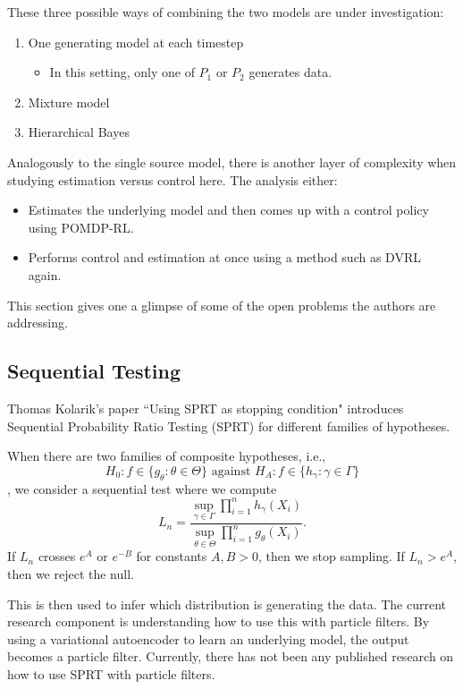 \documentclass[english]{article}
\numberwithin{equation}{section}
\begin{document}
These three possible ways of combining the two models are under investigation:
\begin{enumerate}
	\item One generating model at each timestep
	\begin{itemize}
		\item In this setting, only one of $P_1$ or $P_2$ generates data.
	\end{itemize}
	\item Mixture model
	\item Hierarchical Bayes
\end{enumerate}

Analogously to the single source model, there is another layer of complexity when studying estimation versus control here. The analysis either:
\begin{itemize}
	\item Estimates the underlying model and then comes up with a control policy using POMDP-RL.
	\item Performs control and estimation at once using a method such as DVRL again.
\end{itemize}

This section gives one a glimpse of some of the open problems the authors are addressing.

\subsection*{Sequential Testing}
Thomas Kolarik's paper ``Using SPRT as stopping condition" 
\cite{url} introduces Sequential Probability Ratio Testing (SPRT) for different families of hypotheses.

When there are two families of composite hypotheses, i.e.,
$$H_0: f\in \{g_{\theta}:\theta\in \Theta\} \textrm{ against } H_A:f\in \{h_{\gamma}:\gamma\in \Gamma\}$$, we consider a sequential test where we compute $$L_n = \frac{\sup_{\gamma\in \Gamma} \prod_{i=1}^n h_{\gamma}(X_i)}{\sup_{\theta\in \Theta} \prod_{i=1}^n g_{\theta}(X_i)}.$$ If $L_n$ crosses $e^A$ or $e^{-B}$ for constants $A,B>0$, then we stop sampling. If $L_n>e^A$, then we reject the null.

This is then used to infer which distribution is generating the data.  The current research component is understanding how to use this with particle filters. By using a variational autoencoder to learn an underlying model, the output becomes a particle filter. Currently, there has not been any published research on how to use SPRT with particle filters.
\end{document}
